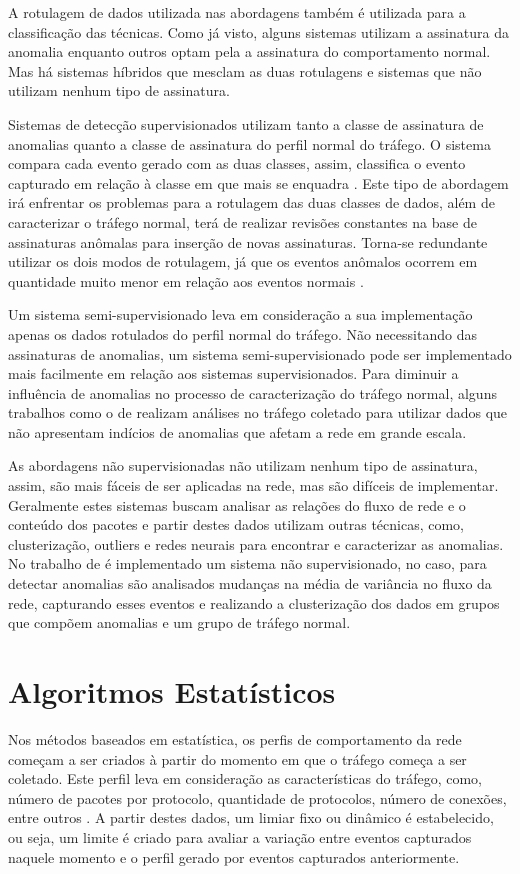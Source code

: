 \indent A rotulagem de dados utilizada nas abordagens também é utilizada para a classificação das técnicas. Como já visto, alguns sistemas utilizam a assinatura da anomalia enquanto outros optam pela a assinatura do comportamento normal. Mas há sistemas híbridos que mesclam as duas rotulagens e sistemas que não utilizam nenhum tipo de assinatura.

\indent Sistemas de detecção supervisionados utilizam tanto a classe de assinatura de anomalias quanto a classe de assinatura do perfil normal do tráfego. O sistema compara cada evento gerado com as duas classes, assim, classifica o evento capturado em relação à classe em que mais se enquadra \cite{chandola2009}. Este tipo de abordagem irá enfrentar os problemas para a rotulagem das duas classes de dados, além de caracterizar o tráfego normal, terá de realizar revisões constantes na base de assinaturas anômalas para inserção de novas assinaturas. Torna-se redundante utilizar os dois modos de rotulagem, já que os eventos anômalos ocorrem em quantidade muito menor em relação aos eventos normais \cite{Bhuyan}.

\indent Um sistema semi-supervisionado leva em consideração a sua implementação apenas os dados rotulados do perfil normal do tráfego. Não necessitando das assinaturas de anomalias, um sistema semi-supervisionado pode ser implementado mais facilmente em relação aos sistemas supervisionados. Para diminuir a influência de anomalias no processo de caracterização do tráfego normal, alguns trabalhos como o de  realizam análises no tráfego coletado para utilizar dados que não apresentam indícios de anomalias que afetam a rede em grande escala.

\indent As abordagens não supervisionadas não utilizam nenhum tipo de assinatura, assim, são mais fáceis de ser aplicadas na rede, mas são difíceis de implementar. Geralmente estes sistemas buscam analisar as relações do fluxo de rede e o conteúdo dos pacotes e partir destes dados utilizam outras técnicas, como, clusterização, outliers e redes neurais para encontrar e caracterizar as anomalias. No trabalho de  é implementado um sistema não supervisionado, no caso, para detectar anomalias são analisados mudanças na média de variância no fluxo da rede, capturando esses eventos e realizando a clusterização dos dados em grupos que compõem anomalias e um grupo de tráfego normal.


  \section{Algoritmos Estatísticos}
\indent Nos métodos baseados em estatística, os perfis de comportamento da rede começam a ser criados à partir do momento em que o tráfego começa a ser coletado. Este perfil leva em consideração as características do tráfego, como, número de pacotes por protocolo, quantidade de protocolos, número de conexões, entre outros \cite{perlin2011}. A partir destes dados, um limiar fixo ou dinâmico é estabelecido, ou seja, um limite é criado para avaliar a variação entre eventos capturados naquele momento e o perfil gerado por eventos capturados anteriormente.

